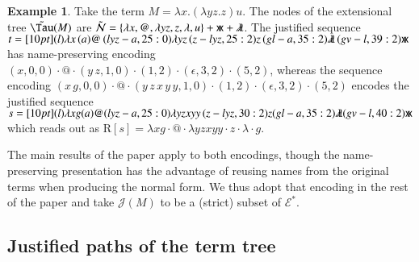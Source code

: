 \documentclass{elsarticle}
\theoremstyle{plain}
\theoremstyle{definition}
\newtheorem{example}{Example}[section]
\newcommand\Nodes{\mathcal{N}}%
\newcommand{\ghostlmd}{{\lambda\mkern-7mu \lambda}}
\newcommand{\ghostvar}{\mathsf{x\mkern-5mu x}}
\newcommand\ExtendedNodes{\tilde{\Nodes}}
\def\readout{\mathrm{R}} %
\def\nameencoding{\mathcal{E}} %
\newcommand{\exttree}{\tilde{\Tau}} %
\def\justseqset{\mathcal{J}}
\begin{document}
\begin{example}
\label{examp:ghost_materialization}
    Take the term $M = \lambda x. (\lambda y z.z) u$. The nodes of the extensional tree $\exttree(M)$ are $\ExtendedNodes = \{ \lambda x, @, \lambda y z, z, \lambda, u \} + \ghostvar + \ghostlmd$. The justified sequence
    $t = \Pstr[10pt]{
        (l){\lambda x} \, (a)@ \, (lyz-a,25:0){\lambda y z} \, (z-lyz,25:2)z \, (gl-a,35:2)\ghostlmd \, (gv-l,39:2)\ghostvar }
    $
    has name-preserving encoding
    $(x ,0,0)\cdot
    @\cdot
    (y\, z, 1,0)\cdot
    (1,2)\cdot
    (\epsilon,3,2)\cdot
    (5,2)$, whereas
    the sequence encoding
    $ (x\, g, 0, 0)\cdot
    @\cdot
    (y\, z\, x\, y\, y, 1,0)\cdot
    (1,2)\cdot
    (\epsilon,3,2) \cdot
    (5,2)$ encodes the justified sequence
    $s= \Pstr[10pt]{
        (l){\lambda x g}
         (a)@
         (lyz-a,25:0){\lambda y z x y y}
         \,(z-lyz,30:2)z
         (gl-a,35:2)\ghostlmd
         (gv-l,40:2)\ghostvar }
    $ which reads out as $\readout[s]= \lambda x g \cdot @ \cdot \lambda y z x y y \cdot z \cdot \lambda \cdot g$.
\end{example}


The main results of the paper apply to both encodings, though
the name-preserving presentation has the advantage of reusing names from the original terms when producing the normal form.
We thus adopt that encoding in the rest of the paper and take $\justseqset(M)$ to be a (strict) subset of $\nameencoding^*$.

\subsection{Justified paths of the term tree}
\end{document}
